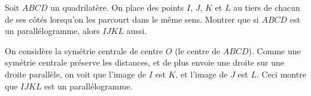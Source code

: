 \begin{exo}
Soit $ABCD$ un quadrilatère. On place des points $I$, $J$, $K$ et $L$ au tiers de chacun de ses côtés lorsqu'on les parcourt dans le même sens. 
Montrer que si $ABCD$ est un parallélogramme, alors $IJKL$ aussi.
\begin{sol}
On considère la symétrie centrale  de centre $O$ (le centre de $ABCD$). Comme une symétrie centrale préserve les distances, et de plus envoie une droite sur une droite parallèle, on voit que l'image de $I$ est $K$, et l'image de $J$ est $L$. Ceci montre que $IJKL$ est un parallélogramme.

\end{sol}
\end{exo}


